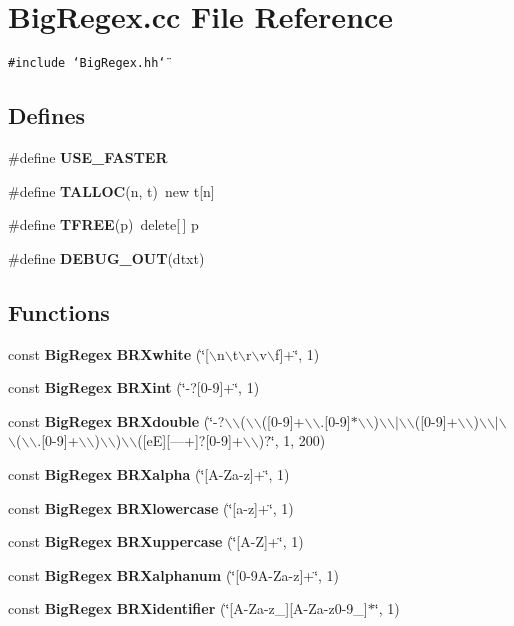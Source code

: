 \section{Big\-Regex.cc File Reference}
\label{BigRegex_8cc}
{\tt \#include \char`\"{}Big\-Regex.hh\char`\"{}}\par
\subsection*{Defines}
\begin{CompactItemize}
\item 
\#define {\bf USE\_\-FASTER}
\item 
\#define {\bf TALLOC}(n, t)\ new t[n]
\item 
\#define {\bf TFREE}(p)\ delete[$\,$] p
\item 
\#define {\bf DEBUG\_\-OUT}(dtxt)
\end{CompactItemize}
\subsection*{Functions}
\begin{CompactItemize}
\item 
const {\bf Big\-Regex} {\bf BRXwhite} (\char`\"{}[$\backslash$n$\backslash$t$\backslash$r$\backslash$v$\backslash$f]+\char`\"{}, 1)
\item 
const {\bf Big\-Regex} {\bf BRXint} (\char`\"{}-?[0-9]+\char`\"{}, 1)
\item 
const {\bf Big\-Regex} {\bf BRXdouble} (\char`\"{}-?$\backslash$$\backslash$($\backslash$$\backslash$([0-9]+$\backslash$$\backslash$.[0-9]$\ast$$\backslash$$\backslash$)$\backslash$$\backslash$$|$$\backslash$$\backslash$([0-9]+$\backslash$$\backslash$)$\backslash$$\backslash$$|$$\backslash$$\backslash$($\backslash$$\backslash$.[0-9]+$\backslash$$\backslash$)$\backslash$$\backslash$)$\backslash$$\backslash$([e\-E][---+]?[0-9]+$\backslash$$\backslash$)?\char`\"{}, 1, 200)
\item 
const {\bf Big\-Regex} {\bf BRXalpha} (\char`\"{}[A-Za-z]+\char`\"{}, 1)
\item 
const {\bf Big\-Regex} {\bf BRXlowercase} (\char`\"{}[a-z]+\char`\"{}, 1)
\item 
const {\bf Big\-Regex} {\bf BRXuppercase} (\char`\"{}[A-Z]+\char`\"{}, 1)
\item 
const {\bf Big\-Regex} {\bf BRXalphanum} (\char`\"{}[0-9A-Za-z]+\char`\"{}, 1)
\item 
const {\bf Big\-Regex} {\bf BRXidentifier} (\char`\"{}[A-Za-z\_\-][A-Za-z0-9\_\-]$\ast$\char`\"{}, 1)
\end{CompactItemize}


